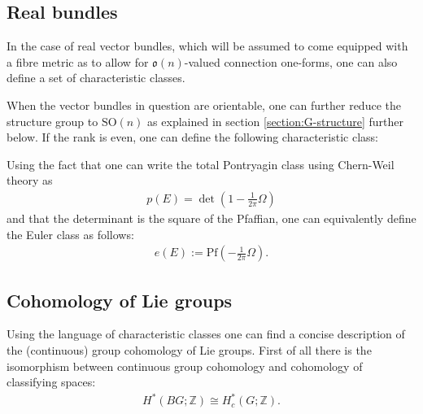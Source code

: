 \subsection{Real bundles}

    In the case of real vector bundles, which will be assumed to come equipped with a fibre metric as to allow for $\mathfrak{o}(n)$-valued connection one-forms, one can also define a set of characteristic classes.


    When the vector bundles in question are orientable, one can further reduce the structure group to $\mathrm{SO}(n)$ as explained in section \ref{section:G-structure} further below. If the rank is even, one can define the following characteristic class:
    \begin{property}
        Using the fact that one can write the total Pontryagin class using Chern-Weil theory as
        \begin{gather}
            p(E) = \det\left(1-\frac{1}{2\pi}\Omega\right)
        \end{gather}
        and that the determinant is the square of the Pfaffian, one can equivalently define the Euler class as follows:
        \begin{gather}
            e(E) := \mathrm{Pf}\left(-\frac{1}{2\pi}\Omega\right).
        \end{gather}
    \end{property}

\subsection{Cohomology of Lie groups}

    Using the language of characteristic classes one can find a concise description of the (continuous) group cohomology of Lie groups. First of all there is the isomorphism between continuous group cohomology and cohomology of classifying spaces:
    \begin{gather}
        H^*(BG;\mathbb{Z})\cong H^*_c(G;\mathbb{Z}).
    \end{gather}

